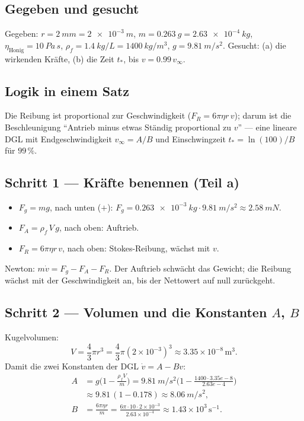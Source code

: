 
\subsection*{Gegeben und gesucht}
Gegeben: $r=\qty{2}{mm}=\qty{2e-3}{m}$,
$m=\qty{0.263}{g}=\qty{2.63e-4}{kg}$,
$\eta_{\text{Honig}}=\qty{10}{Pa\,s}$,
$\rho_f=\qty{1.4}{kg/L}=\qty{1400}{kg/m^3}$, $g=\qty{9.81}{m/s^2}$.
Gesucht: (a) die wirkenden Kräfte, (b) die Zeit $t_*$, bis $v=0.99\,v_\infty$.

\subsection*{Logik in einem Satz}
Die Reibung ist proportional zur Geschwindigkeit ($F_R=6\pi\eta r\,v$); darum ist
die Beschleunigung ``Antrieb minus etwas Ständig proportional zu $v$'' --- eine
lineare DGL mit Endgeschwindigkeit $v_\infty=A/B$ und
Einschwingzeit $t_*=\ln(100)/B$ für $99\,\%$.

\subsection*{Schritt 1 --- Kräfte benennen (Teil a)}
\begin{itemize}
  \item $F_g=mg$, nach unten ($+$):
        $F_g=\qty{0.263e-3}{kg}\cdot\qty{9.81}{m/s^2}\approx\qty{2.58}{mN}$.
  \item $F_A=\rho_f\,V\,g$, nach oben: Auftrieb.
  \item $F_R=6\pi\eta r\,v$, nach oben: Stokes-Reibung, wächst mit $v$.
\end{itemize}
Newton: $m\dot v=F_g-F_A-F_R$. Der Auftrieb schwächt das Gewicht; die Reibung
wächst mit der Geschwindigkeit an, bis der Nettowert auf null zurückgeht.

\subsection*{Schritt 2 --- Volumen und die Konstanten $A$, $B$}
Kugelvolumen:
\[
 V=\frac43\pi r^3=\frac43\pi (2\times10^{-3})^3
   \approx 3.35\times10^{-8}\,\mathrm{m^3}.
\]
Damit die zwei Konstanten der DGL $\dot v = A - Bv$:
\begin{align}
  A&=g\Big(1-\frac{\rho_f V}{m}\Big)
    = \qty{9.81}{m/s^2}\Big(1-\frac{1400\cdot 3.35e-8}{2.63e-4}\Big)\\
    &\approx 9.81\,(1-0.178)\approx \qty{8.06}{m/s^2},\\[2mm]
  B&=\frac{6\pi\eta r}{m}
    =\frac{6\pi\cdot 10\cdot 2\times10^{-3}}{2.63\times10^{-4}}
    \approx 1.43\times10^{3}\,\mathrm{s^{-1}}.
\end{align}

